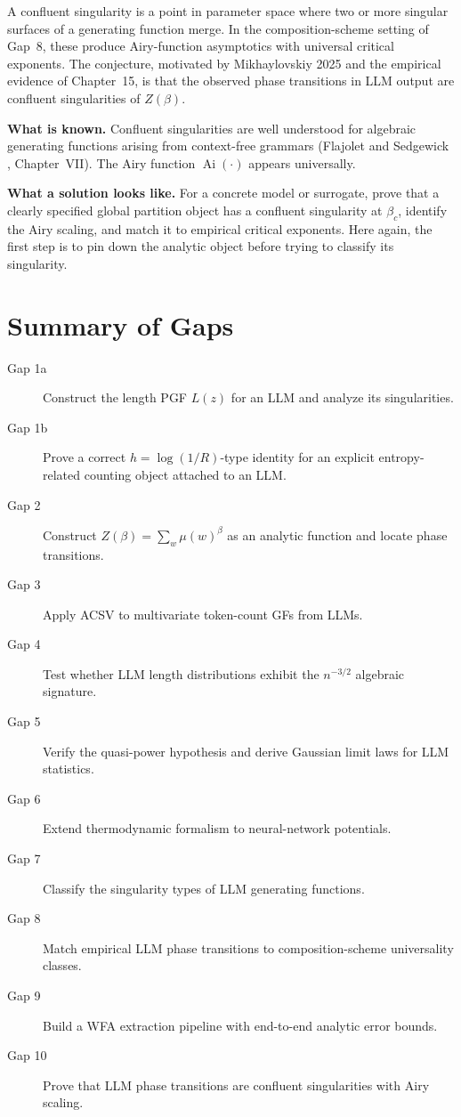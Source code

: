 A confluent singularity is a point in parameter space where two or more singular surfaces of a generating function merge. In the composition-scheme setting of Gap~8, these produce Airy-function asymptotics with universal critical exponents. The conjecture, motivated by Mikhaylovskiy 2025 \cite{Mikhaylovskiy2025} and the empirical evidence of Chapter~15, is that the observed phase transitions in LLM output are confluent singularities of $Z(\beta)$.

\textbf{What is known.} Confluent singularities are well understood for algebraic generating functions arising from context-free grammars (Flajolet and Sedgewick \cite{FlajoletSedgewick2009}, Chapter~VII). The Airy function $\operatorname{Ai}(\cdot)$ appears universally.

\textbf{What a solution looks like.} For a concrete model or surrogate, prove that a clearly specified global partition object has a confluent singularity at $\beta_c$, identify the Airy scaling, and match it to empirical critical exponents. Here again, the first step is to pin down the analytic object before trying to classify its singularity.

\section{Summary of Gaps}

\begin{description}
\item[Gap 1a] Construct the length PGF $L(z)$ for an LLM and analyze its singularities.
\item[Gap 1b] Prove a correct $h=\log(1/R)$-type identity for an explicit entropy-related counting object attached to an LLM.
\item[Gap 2] Construct $Z(\beta)=\sum_w\mu(w)^\beta$ as an analytic function and locate phase transitions.
\item[Gap 3] Apply ACSV to multivariate token-count GFs from LLMs.
\item[Gap 4] Test whether LLM length distributions exhibit the $n^{-3/2}$ algebraic signature.
\item[Gap 5] Verify the quasi-power hypothesis and derive Gaussian limit laws for LLM statistics.
\item[Gap 6] Extend thermodynamic formalism to neural-network potentials.
\item[Gap 7] Classify the singularity types of LLM generating functions.
\item[Gap 8] Match empirical LLM phase transitions to composition-scheme universality classes.
\item[Gap 9] Build a WFA extraction pipeline with end-to-end analytic error bounds.
\item[Gap 10] Prove that LLM phase transitions are confluent singularities with Airy scaling.
\end{description}

